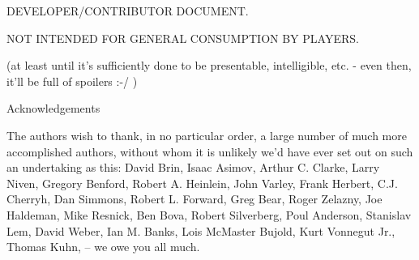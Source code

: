 \vspace{1cm}
\centerline{\LARGE DEVELOPER/CONTRIBUTOR DOCUMENT.}
\centerline{\LARGE NOT INTENDED FOR GENERAL CONSUMPTION BY PLAYERS.}
\vspace{0.5cm}
\centerline{(at least until it's sufficiently done to be presentable, intelligible, etc. - even then, it'll be full of spoilers :-/ )}
\vspace{3cm}
\clearpage
{\centerline{\LARGE Acknowledgements}}
\vspace{2cm}
{\rm 

The authors wish to thank, in no particular order, a large number of
much more accomplished authors, without whom it is unlikely we'd have
ever set out on such an undertaking as this: David Brin, Isaac Asimov,
Arthur C. Clarke, Larry Niven, Gregory Benford, Robert A. Heinlein,
John Varley, Frank Herbert, C.J. Cherryh, Dan Simmons, Robert
L. Forward, Greg Bear, Roger Zelazny, Joe Haldeman, Mike Resnick, Ben
Bova, Robert Silverberg, Poul Anderson, Stanislav Lem, David Weber,
Ian M. Banks, Lois McMaster Bujold, Kurt Vonnegut Jr., Thomas Kuhn, -- we owe you all much.

}

